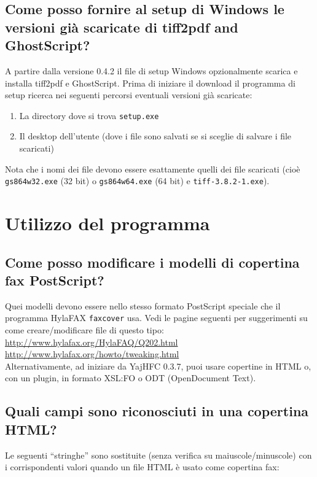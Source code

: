 \documentclass[a4paper,10pt]{scrartcl}
\begin{document}
\subsection{Come posso fornire al setup di Windows le versioni già scaricate di tiff2pdf and GhostScript?}

A partire dalla versione 0.4.2 il file di setup Windows opzionalmente scarica e installa tiff2pdf e GhostScript.
Prima di iniziare il download il programma di setup ricerca nei seguenti percorsi eventuali versioni già scaricate:
\begin{enumerate}
 \item La directory dove si trova \texttt{setup.exe}
 \item Il desktop dell'utente (dove i file sono salvati se si sceglie di salvare i file scaricati)
\end{enumerate}

Nota che i nomi dei file devono essere esattamente quelli dei file scaricati (cioè \texttt{gs864w32.exe} (32 bit) o \texttt{gs864w64.exe} (64 bit) e \texttt{tiff-3.8.2-1.exe}).

\section{Utilizzo del programma}	

\subsection{Come posso modificare i modelli di copertina fax PostScript?}
Quei modelli devono essere nello stesso formato PostScript speciale che il programma HylaFAX
\texttt{faxcover} usa. Vedi le pagine seguenti per suggerimenti su come creare/modificare
file di questo tipo: \\
\url{http://www.hylafax.org/HylaFAQ/Q202.html}\\
\url{http://www.hylafax.org/howto/tweaking.html}\\

Alternativamente, ad iniziare da YajHFC 0.3.7, puoi usare copertine in HTML o, con un plugin, in formato XSL:FO o ODT (OpenDocument Text).

\subsection{Quali campi sono riconosciuti in una copertina HTML?}

Le seguenti ``stringhe'' sono sostituite (senza verifica su maiuscole/minuscole) con i corrispondenti valori quando un file HTML è usato come copertina fax:
\end{document}
